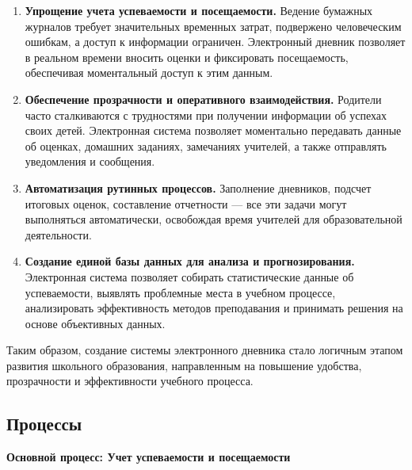\documentclass[a4paper, final]{article}
\begin{document}
\begin{enumerate}
  \item \textbf{Упрощение учета успеваемости и посещаемости.} Ведение бумажных журналов требует значительных временных затрат, подвержено человеческим ошибкам, а доступ к информации ограничен. Электронный дневник позволяет в реальном времени вносить оценки и фиксировать посещаемость, обеспечивая моментальный доступ к этим данным.

  \item \textbf{Обеспечение прозрачности и оперативного взаимодействия.} Родители часто сталкиваются с трудностями при получении информации об успехах своих детей. Электронная система позволяет моментально передавать данные об оценках, домашних заданиях, замечаниях учителей, а также отправлять уведомления и сообщения.
  
  \item \textbf{Автоматизация рутинных процессов.} Заполнение дневников, подсчет итоговых оценок, составление отчетности --- все эти задачи могут выполняться автоматически, освобождая время учителей для образовательной деятельности.
  
  \item \textbf{Создание единой базы данных для анализа и прогнозирования.} Электронная система позволяет собирать статистические данные об успеваемости, выявлять проблемные места в учебном процессе, анализировать эффективность методов преподавания и принимать решения на основе объективных данных.
\end{enumerate}


Таким образом, создание системы электронного дневника стало логичным этапом развития школьного образования, направленным на повышение удобства, прозрачности и эффективности учебного процесса.

\subsection{Процессы}
\textbf{Основной процесс: Учет успеваемости и посещаемости}
\end{document}
